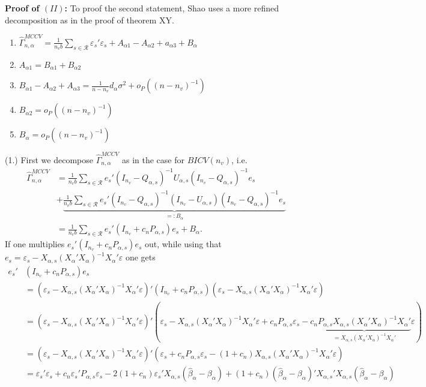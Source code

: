 \documentclass[Research_Module_ES.tex]{subfiles}
\begin{document}
\textbf{Proof of $(II)$:}
To proof the second statement, Shao uses a more refined decomposition as in the proof of theorem XY. 
\begin{enumerate}
\item  $\hat{\Gamma}_{n,\alpha}^{MCCV} = \frac{1}{n_vb}\sum_{s\in \mathcal{R}}\varepsilon_s'\varepsilon_s+ A_{\alpha1}-A_{\alpha2}+a_{\alpha3}+B_\alpha$
\item $A_{\alpha1} = B_{\alpha1}+ B_{\alpha2}$
\item $ B_{\alpha1}-A_{\alpha2}+A_{\alpha3} = \frac{1}{n-n_v}d_\alpha\sigma^2 + o_P((n-n_v)^{-1})$
\item $B_{\alpha2} = o_P((n-n_v)^{-1})$
\item $B_{\alpha} = o_P((n-n_v)^{-1})$
\end{enumerate}
(1.)
First we decompose $\hat{\Gamma}_{n,\alpha}^{MCCV}$ as in the case for $BICV(n_v)$, i.e.
\begin{align*}
\hat{\Gamma}_{n,\alpha}^{MCCV} &= \frac{1}{n_vb}\sum_{s\in\mathcal{R}}e_s'(I_{n_v}-Q_{\alpha,s})^{-1}U_{\alpha,s}(I_{n_v}-Q_{\alpha,s})^{-1}e_s\\
&+\underbrace{\frac{1}{n_vb}\sum_{s\in\mathcal{R}}e_s'(I_{n_v}-Q_{\alpha,s})^{-1}(I_{n_v}-U_{\alpha,s})(I_{n_v}-Q_{\alpha,s})^{-1}e_s}_{=:B_{\alpha}}\\
&= \frac{1}{n_vb}\sum_{s\in\mathcal{R}}e_s'(I_{n_v}+c_nP_{\alpha,s})e_s + B_\alpha.
\end{align*}
If one multiplies $e_s'(I_{n_v}+c_nP_{\alpha,s})e_s$ out, while using that $e_s = \varepsilon_s - X_{\alpha,s}(X_\alpha'X_\alpha)^{-1}X_\alpha'\varepsilon$ one gets
\begin{align*}
e_s'&(I_{n_v}+c_nP_{\alpha,s})e_s \\
&= (\varepsilon_s - X_{\alpha,s}(X_\alpha'X_\alpha)^{-1}X_\alpha'\varepsilon)'(I_{n_v}+c_nP_{\alpha,s})(\varepsilon_s - X_{\alpha,s}(X_\alpha'X_\alpha)^{-1}X_\alpha'\varepsilon)\\
&= (\varepsilon_s - X_{\alpha,s}(X_\alpha'X_\alpha)^{-1}X_\alpha'\varepsilon)'(\varepsilon_s - X_{\alpha,s}(X_\alpha'X_\alpha)^{-1}X_\alpha'\varepsilon + c_nP_{\alpha,s}\varepsilon_s - c_n\underbrace{P_{\alpha,s}X_{\alpha,s}(X_\alpha'X_\alpha)^{-1}X_\alpha'}_{=X_{\alpha,s}(X_\alpha'X_\alpha)^{-1}X_\alpha'}\varepsilon)\\
&= (\varepsilon_s - X_{\alpha,s}(X_\alpha'X_\alpha)^{-1}X_\alpha'\varepsilon)'(\varepsilon_s + c_nP_{\alpha,s}\varepsilon_s -(1+c_n) X_{\alpha,s}(X_\alpha'X_\alpha)^{-1}X_\alpha'\varepsilon)  \\
&= \varepsilon_s'\varepsilon_s + c_n \varepsilon_s'P_{\alpha,s}\varepsilon_s -2(1+c_n)\varepsilon_s' X_{\alpha,s}(\hat{\beta}_\alpha-\beta_\alpha) + (1+c_n)(\hat{\beta}_\alpha-\beta_\alpha)'X_{\alpha,s}'X_{\alpha,s}(\hat{\beta}_\alpha-\beta_\alpha)
\end{align*}
\end{document}
